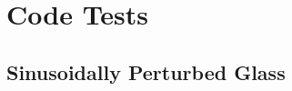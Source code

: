 \documentclass[fleq,usenatbib]{mnras}
\begin{document}
{%

\section{Code Tests}\label{sec:tsts}
\subsection{Sinusoidally Perturbed Glass}
}
\end{document}
